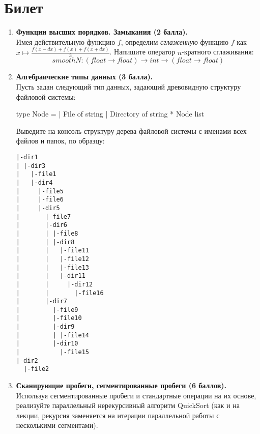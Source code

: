 \documentclass[a4paper,11pt]{article}
\newcommand{\<}{\langle}
\renewcommand{\>}{\rangle}
\begin{document}
\section*{Билет }
\begin{enumerate}
\item \textbf{Функции высших порядков. Замыкания (2 балла).}\\
  Имея действительную функцию $f$, определим \textit{сглаженную} функцию
  $f$ как $x \mapsto \frac{f(x-dx) + f(x) + f(x+dx)}{3}$. Напишите оператор
  $n$-кратного сглаживания:
  $$ smoothN: (float \to float) \to int \to (float \to float) $$

\item \textbf{Алгебраические типы данных (3 балла).}\\
  Пусть задан следующий тип данных, задающий древовидную структуру файловой
  системы:
  \begin{fsharp}
    type Node =
    | File of string
    | Directory of string * Node list
  \end{fsharp}
  Выведите на консоль структуру дерева файловой системы с именами всех файлов
  и папок, по образцу:
  \begin{lstlisting}[language={}, basicstyle=\ttfamily\scriptsize]
|-dir1
| |-dir3
|   |-file1
|   |-dir4
|     |-file5
|     |-file6
|     |-dir5
|       |-file7
|       |-dir6
|       | |-file8
|       | |-dir8
|       |   |-file11
|       |   |-file12
|       |   |-file13
|       |   |-dir11
|       |     |-dir12
|       |       |-file16
|       |-dir7
|         |-file9
|         |-file10
|         |-dir9
|         | |-file14
|         |-dir10
|           |-file15
|-dir2
  |-file2
  \end{lstlisting}

\item \textbf{Сканирующие пробеги, сегментированные пробеги (6 баллов).}\\
  Используя сегментированные пробеги и стандартные операции на их основе,
  реализуйте параллельный нерекурсивный алгоритм QuickSort (как и на лекции,
  рекурсия заменяется на итерации параллельной работы с несколькими сегментами).
\end{enumerate}
\newpage
\end{document}
